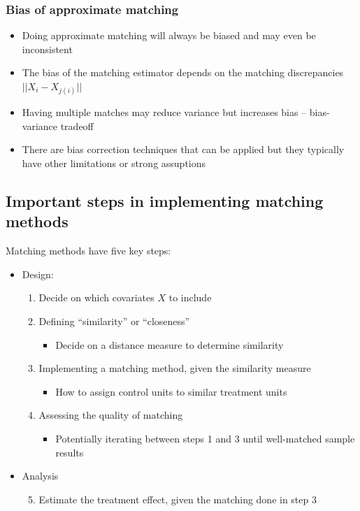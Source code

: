 \documentclass[10pt]{article}
\begin{document}
\subsubsection{Bias of approximate matching}
\begin{itemize}
    \item Doing approximate matching will always be biased and may even be inconsistent 
    \item The bias of the matching estimator depends on the matching discrepancies $||X_i - X_{j(i)}|| $
    \item Having multiple matches may reduce variance but increases bias -- bias-variance tradeoff 
    \item There are bias correction techniques that can be applied but they typically have other limitations or strong assuptions 
\end{itemize}
\subsection{Important steps in implementing matching methods}
Matching methods have five key steps: 
\begin{itemize}
    \item Design: 
    \begin{enumerate}
        \item Decide on which covariates $X $ to include 
        \item Defining ``similarity'' or ``closeness''
        \begin{itemize}
            \item Decide on a distance measure to determine similarity
        \end{itemize}
        \item Implementing a matching method, given the similarity measure
        \begin{itemize}
            \item How to assign control units to similar treatment units 
        \end{itemize}
        \item Assessing the quality of matching 
        \begin{itemize}
            \item Potentially iterating between steps 1 and 3 until well-matched sample results 
        \end{itemize}
    \end{enumerate}
    \item Analysis 
    \begin{enumerate}\setcounter{enumi}{4}
        \item Estimate the treatment effect, given the matching done in step 3
    \end{enumerate}
\end{itemize}
\newpage 
\end{document}
